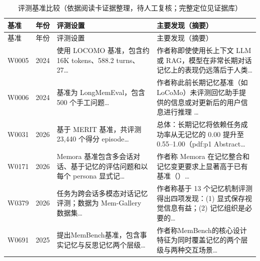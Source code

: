 \begin{small}
\begin{longtable}{p{1.1cm}p{0.6cm}p{5.4cm}p{6.8cm}}
\caption{评测基准比较（依据阅读卡证据整理，待人工复核；完整定位见证据库）}\label{tab:benchmarks}\\
\toprule
基准 & 年份 & 评测设置 & 主要发现（摘要） \\
\midrule\endfirsthead
\toprule
基准 & 年份 & 评测设置 & 主要发现（摘要） \\
\midrule\endhead
\bottomrule\endfoot
W0005 & 2024 & 使用 LOCOMO 基准，包含约 16K tokens、588.2 turns、27… & 作者称即使使用长上下文 LLM 或 RAG，模型在非常长期对话记忆上的表现仍远落后于人类… \\
W0006 & 2024 & 基准为 LongMemEval，包含 500 个手工问题… & 作者称此前长期记忆基准（如 LoCoMo）未评测回忆助手提供的信息或对更新后的用户信息进行推理 … \\
W0031 & 2026 & 基于 MERIT 基准，共评测 23,440 个得分 episode… & 总体：长期记忆将依赖任务成功率从无记忆的 0.00 提升至 0.55–1.00（pdf:p1 Abstract… \\
W0171 & 2026 & Memora 基准包含多会话对话、基于记忆的评估问题和以每个 persona 显式记… & 作者称 Memora 在记忆整合和记忆变更要求上显著高于已有基准（）… \\
W0379 & 2026 & 任务为跨会话多模态对话记忆评测；数据为 Mem-Gallery 数据集… & 作者称基于 13 个记忆机制评测得出四项发现：(1) 显式保存视觉信息有益；(2) 记忆组织是必要的… \\
W0691 & 2025 & 提出MemBench基准，包含事实记忆与反思记忆两个层级… & 作者称MemBench的核心设计特征为同时覆盖记忆的两个层级与两种交互场景… \\
\end{longtable}
\end{small}
